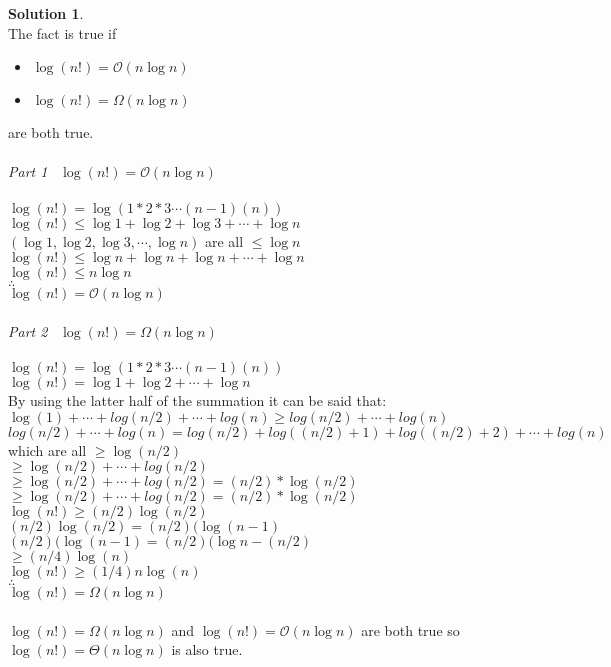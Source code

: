 \documentclass{article}
\theoremstyle{definition}
\newtheorem*{solution}{Solution}
\begin{document}
\begin{solution} 
\\ The fact is true if 
\begin{itemize}
    \item $\log{}(n!) = \mathcal{O}(n\log{}n)$
    \item $\log{}(n!) = \Omega(n\log{}n)$
\end{itemize}
are both true.\\ \\
\emph{Part 1} \ 
$\log{}(n!) = \mathcal{O}(n\log{}n)$ \\ \\ 
$\log{}(n!) = \log{}(1*2*3 \cdots (n-1)(n))$ \\ 
$\log{}(n!) \leq \log{}1 + \log{}2 + \log{}3 + \cdots + \log{}n $ \\
$(\log{}1 , \log{}2 , \log{}3 , \cdots , \log{}n)$ are all $\leq \log{}n$
\\ $\log{}(n!) \leq \log{}n + \log{}n + \log{}n + \cdots + \log{}n$ \\
$\log{}(n!) \leq n\log{}n $ \\
$\therefore$ \\ 
$\log{}(n!) = \mathcal{O}(n\log{}n)$ \\ 
\\
\emph{Part 2}  \
$\log{}(n!) = \Omega(n\log{}n)$ \\ \\ 
$\log{}(n!) = \log{}(1*2*3 \cdots (n-1)(n))$ \\ 
$\log{}(n!) = \log{}1 + \log{}2 + \cdots + \log{}n $ \\
By using the latter half of the summation it can be said that: \\ 
$\log{}(1) + \cdots + log{}(n/2) + \cdots + log{}(n) \geq log{}(n/2) + \cdots + log{}(n) $ \\
$log{}(n/2) + \cdots + log{}(n) = log{}(n/2) + log{}((n/2)+1) + log{}((n/2)+2) + \cdots + log{}(n) $ \\
 which are all $\geq \log{}(n/2)$ \\
$\geq \log{}(n/2)  + \cdots + log{}(n/2) $ \\
$\geq \log{}(n/2)  + \cdots + log{}(n/2) =(n/2) * \log{}(n/2)$\\
$\geq \log{}(n/2)  + \cdots + log{}(n/2) =(n/2) * \log{}(n/2)$\\
$\log{}(n!) \geq (n/2) \log{}(n/2)$ \\
$(n/2) \log{}(n/2) = (n/2)(\log{}(n-1)$\\
$(n/2)(\log{}(n-1) = (n/2)(\log{}n-(n/2)$\\
$\geq (n/4)\log{}(n)$\\
$\log{}(n!) \geq (1/4)n\log{}(n)$\\
$\therefore$ \\ 
$\log{}(n!) = \Omega(n\log{}n)$ \\ \\ 
$\log{}(n!) = \Omega(n\log{}n)$ and $\log{}(n!) = \mathcal{O}(n\log{}n)$ are both true so $\log(n!) = \Theta(n\log n)$ is also true.


\end{solution}
\end{document}
